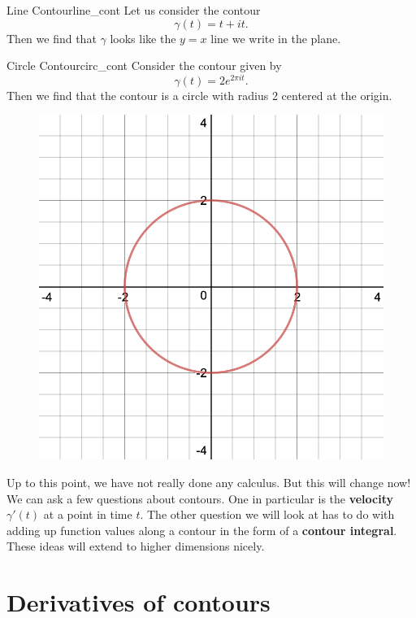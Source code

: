        \begin{ex}{Line Contour}{line_cont}
        Let us consider the contour
        \[
        \gamma(t)=t+it.
        \]
        Then we find that $\gamma$ looks like the $y=x$ line we write in the plane.
        
        \begin{center}
        \end{center}
        \end{ex}
        
        \begin{ex}{Circle Contour}{circ_cont}
        Consider the contour given by
        \[
        \gamma(t)=2e^{2\pi i t}.
        \]
        Then we find that the contour is a circle with radius 2 centered at the origin.
        \begin{figure}[H]
            \centering
            \includegraphics[width=.4\textwidth]{Figures/circle_r2.png}
        \end{figure}
        \end{ex}
        
        Up to this point, we have not really done any calculus.  But this will change now! We can ask a few questions about contours.  One in particular is the \textbf{velocity} $\gamma'(t)$ at a point in time $t$.  The other question we will look at has to do with adding up function values along a contour in the form of a \textbf{contour integral}.  These ideas will extend to higher dimensions nicely.  
        
        \section{Derivatives of contours}
        
